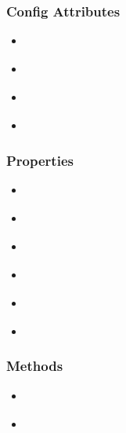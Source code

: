\documentclass[letterpaper,10pt,english]{sphinxmanual}
\begin{document}
\subsubsection{Config Attributes}
\label{api/component/datalazyload/index:config-attributes}\begin{itemize}
\item {}
{\hyperref[api/component/datalazyload/index:DataLazyload.mod]{}}

\item {}
{\hyperref[api/component/datalazyload/index:DataLazyload.diff]{}}

\item {}
{\hyperref[api/component/datalazyload/index:DataLazyload.placeholder]{}}

\item {}
{\hyperref[api/component/datalazyload/index:DataLazyload.execScript]{}}

\end{itemize}


\subsubsection{Properties}
\label{api/component/datalazyload/index:properties}\begin{itemize}
\item {}
{\hyperref[api/component/datalazyload/index:DataLazyload.containers]{}}

\item {}
{\hyperref[api/component/datalazyload/index:DataLazyload.config]{}}

\item {}
{\hyperref[api/component/datalazyload/index:DataLazyload.images]{}}

\item {}
{\hyperref[api/component/datalazyload/index:DataLazyload.areaes]{}}

\item {}
{\hyperref[api/component/datalazyload/index:DataLazyload.callbacks]{}}

\item {}
{\hyperref[api/component/datalazyload/index:DataLazyload.threshold]{}}

\end{itemize}


\subsubsection{Methods}
\label{api/component/datalazyload/index:methods}\begin{itemize}
\item {}
{\hyperref[api/component/datalazyload/index:DataLazyload.addCallback]{}}

\item {}
{\hyperref[api/component/datalazyload/index:DataLazyload.loadCustomLazyData]{}}

\end{itemize}
\end{document}
